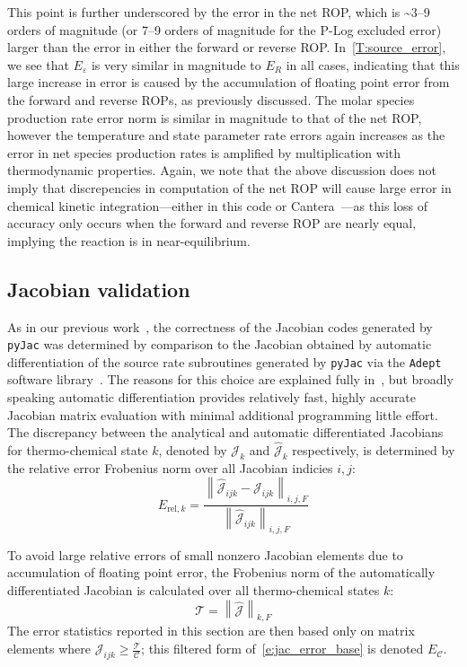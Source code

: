 \documentclass[12pt,number,sort&compress,preprint]{elsarticle}
\begin{document}
This point is further underscored by the error in the net ROP, which is \textasciitilde\numrange{3}{9} orders of magnitude (or \numrange{7}{9} orders of magnitude for the P-Log excluded error) larger than the error in either the forward or reverse ROP.
In~\cref{T:source_error}, we see that $E_{\varepsilon}$ is very similar in magnitude to $E_R$ in all cases, indicating that this large increase in error is caused by the accumulation of floating point error from the forward and reverse ROPs, as previously discussed.
The molar species production rate error norm is similar in magnitude to that of the net ROP, however the temperature and state parameter rate errors again increases as the error in net species production rates is amplified by multiplication with thermodynamic properties.
Again, we note that the above discussion does not imply that discrepencies in computation of the net ROP will cause large error in chemical kinetic integration---either in this code or Cantera~\cite{Cantera}---as this loss of accuracy only occurs when the forward and reverse ROP are nearly equal, implying the reaction is in near-equilibrium.

\subsection{Jacobian validation}

As in our previous work~\cite{Niemeyer:2016aa}, the correctness of the Jacobian codes generated by \texttt{pyJac} was determined by comparison to the Jacobian obtained by automatic differentiation of the source rate subroutines generated by \texttt{pyJac} via the \texttt{Adept} software library~\cite{adept-v11,hogan2014fast}.
The reasons for this choice are explained fully in~\cite{Niemeyer:2016aa}, but broadly speaking automatic differentiation provides relatively fast, highly accurate Jacobian matrix evaluation with minimal additional programming little effort.
The discrepancy between the analytical and automatic differentiated Jacobians for thermo-chemical state $k$, denoted by $\mathcal{J}_k$ and $\hat{\mathcal{J}}_k$ respectively, is determined by the relative error Frobenius norm over all Jacobian indicies $i, j$:
\begin{equation}
 \label{e:jac_error_base}
 E_{\text{rel}, k} = \frac{\left\lVert \hat{\mathcal{J}}_{ijk} - \mathcal{J}_{ijk} \right\rVert_{i,j,F}}{\left\lVert \hat{\mathcal{J}}_{ijk} \right\rVert_{i,j,F}}
\end{equation}

To avoid large relative errors of small nonzero Jacobian elements due to accumulation of floating point error, the Frobenius norm of the automatically differentiated Jacobian is calculated over all thermo-chemical states $k$:
\begin{equation}
 \label{e:thresh}
 \mathcal{T} = \left\lVert \mathcal{\hat{J}} \right\rVert_{k, F}
\end{equation}
The error statistics reported in this section are then based only on matrix elements where $\mathcal{J}_{ijk} \ge \frac{\mathcal{T}}{\mathcal{C}}$; this filtered form of~\cref{e:jac_error_base} is denoted $E_{\mathcal{C}}$.
\end{document}
